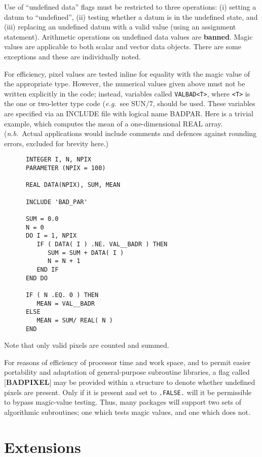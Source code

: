 \documentclass[twoside,11pt]{article}
\newcommand{\xref}[3]{#1}
\newcommand{\xlabel}[1]{}
\renewcommand{\_}{\texttt{\symbol{95}}}
\begin{document}
Use of ``undefined data'' flags must be restricted to three operations:
(i) setting a datum to ``undefined'', (ii) testing whether a datum is
in the undefined state, and (iii) replacing an undefined datum with a
valid value (using an assignment statement).  Arithmetic operations on
undefined data values are {\bf banned}.  Magic values are applicable to both
scalar and vector data objects.  There are some exceptions and these
are individually noted.

For efficiency, pixel values are tested inline for equality with the
magic value of the appropriate type.  However, the numerical values
given above must not be written explicitly in the code; instead,
variables called {\tt VAL\_\_BAD<T>}, where {\tt <T>} is the one or two-letter
type code ({\it e.g.}\  see \xref{SUN/7}{sun7}), should
be used.  These variables are specified
via an INCLUDE file with logical name BAD\_PAR.  Here is a trivial
example, which computes the mean of a one-dimensional REAL array.
({\it n.b.}\ Actual applications would include comments and
defences against rounding errors, excluded for brevity here.)

\goodbreak
\begin{verbatim}
      INTEGER I, N, NPIX
      PARAMETER (NPIX = 100)

      REAL DATA(NPIX), SUM, MEAN

      INCLUDE 'BAD_PAR'

      SUM = 0.0
      N = 0
      DO I = 1, NPIX
         IF ( DATA( I ) .NE. VAL__BADR ) THEN
            SUM = SUM + DATA( I )
            N = N + 1
         END IF
      END DO

      IF ( N .EQ. 0 ) THEN
         MEAN = VAL__BADR
      ELSE
         MEAN = SUM/ REAL( N )
      END
\end{verbatim}

Note that only valid pixels are counted and summed.

For reasons of efficiency of processor time and work space, and to
permit easier portability and adaptation of general-purpose subroutine
libraries, a flag called {[}{\bf BAD\_PIXEL}{]} may be
provided within a structure
to denote whether undefined pixels are present.  Only if it is present
and set to {\tt .FALSE.} will it be
permissible to bypass magic-value testing.  Thus, many packages
will support two sets of algorithmic subroutines; one which
tests magic values, and one which does not. 

\section{\xlabel{se_exten}Extensions\label{se:exten}}
\end{document}
